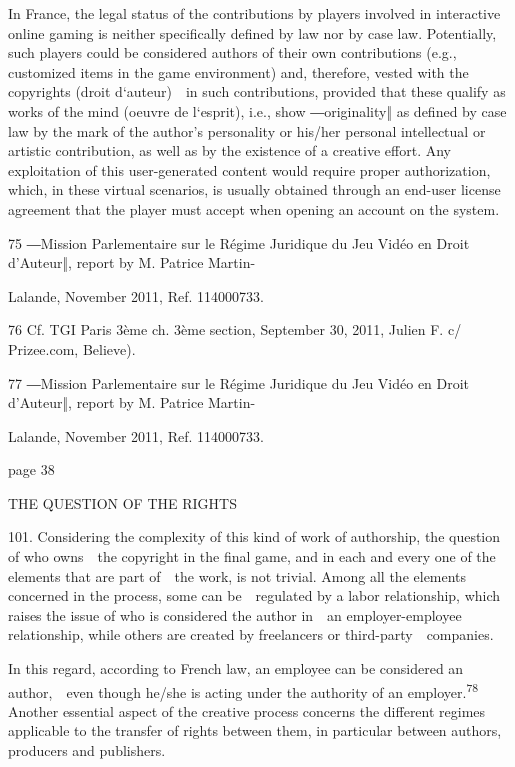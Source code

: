 \documentclass[
]{article}
\begin{document}
{In France, the legal status of the contributions by players involved in
interactive online gaming is neither specifically defined by law nor by
case law. Potentially, such players could be considered authors of their
own contributions (e.g., customized items in the game environment) and,
therefore, vested with the copyrights (}{droit d`auteur}{)~~in such
contributions, provided that these qualify as works of the mind
(}{oeuvre de l`esprit}{), i.e., }{show ―originality‖ as defined by case
law by the mark of the author's personality or his/her }{personal
intellectual or artistic contribution, as well as by the existence of a
creative effort. Any exploitation of this user-generated content would
require proper authorization, which, in these virtual scenarios, is
usually obtained through an end-user license agreement that the player
must accept when opening an account on the system.}

{75 }{―}{Mission Parlementaire sur le Régime Juridiq}{ue du Jeu Vidéo en
Droit d'Auteur‖, report by M}{. Patrice Martin-}

{Lalande, November 2011, Ref. 114000733.}

{76 }{Cf. TGI Paris 3ème ch. 3ème section, September 30, 2011, }{Julien
F. c/ Prizee.com}{, Believe).}

{77 }{―Mission Parlementaire sur le Régime Juridique du Jeu Vidéo en
Droit d'Auteur‖, }{report by M. Patrice Martin-}

{Lalande, November 2011, Ref. 114000733.}

{page 38}

{THE QUESTION OF THE RIGHTS}

{101. }{Considering the complexity of this kind of work of authorship,
the question of who owns~~the copyright in the final game, and in each
and every one of the elements that are part of~~the work, is not
trivial. Among all the elements concerned in the process, some can
be~~regulated by a labor relationship, which raises the issue of who is
considered the author in~~an employer-employee relationship, while
others are created by freelancers or third-party~~companies.}

{In this regard, according to French law, an employee can be considered
an }{author}{,~~even though he/she is acting under the authority of an
employer.}\textsuperscript{{78 }}{Another essential aspect of the
creative process concerns the different regimes applicable to the
transfer of rights between them, in particular between authors,
producers and publishers.}
\end{document}
